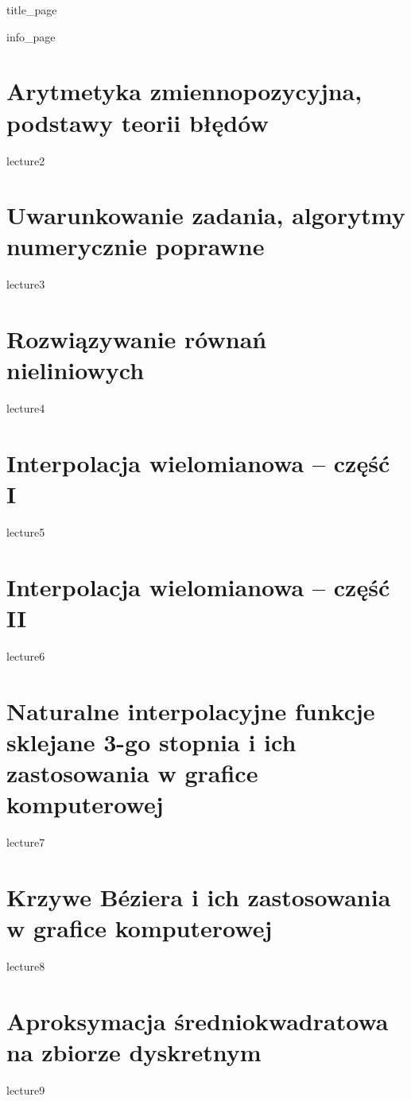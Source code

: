 \documentclass[12pt]{report}
\begin{document}
{title_page}

{info_page}

\tableofcontents

\chapter{}

\chapter{Arytmetyka zmiennopozycyjna, podstawy teorii błędów}
{lecture2}

\chapter{Uwarunkowanie zadania, algorytmy numerycznie poprawne}
{lecture3}

\chapter{Rozwiązywanie równań nieliniowych}
{lecture4}

\chapter{Interpolacja wielomianowa -- część I}
{lecture5}

\chapter{Interpolacja wielomianowa -- część II}
{lecture6}

\chapter{Naturalne interpolacyjne funkcje sklejane 3-go stopnia i ich zastosowania w grafice komputerowej}
{lecture7}

\chapter{Krzywe Béziera i ich zastosowania w grafice komputerowej}
{lecture8}

\chapter{Aproksymacja średniokwadratowa na zbiorze dyskretnym}
{lecture9}
\end{document}
